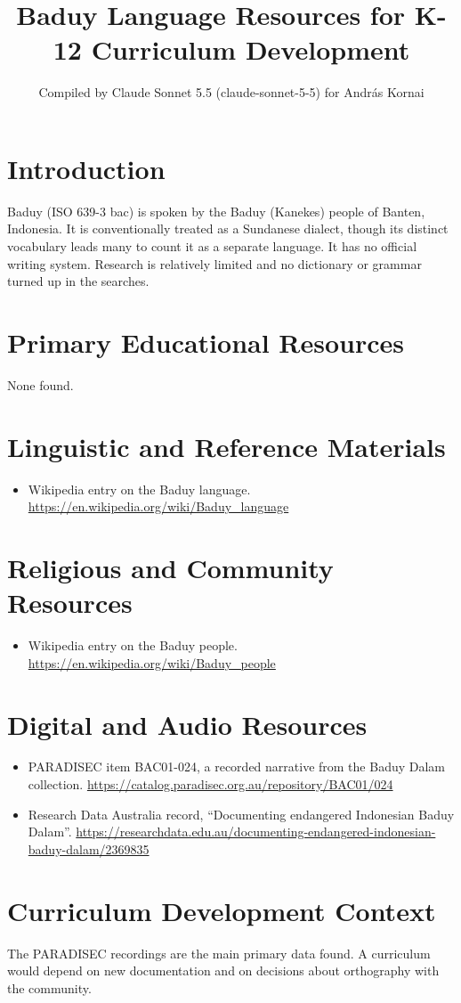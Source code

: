 \documentclass[12pt]{article}
\title{Baduy Language Resources for K-12 Curriculum Development}
\author{Compiled by Claude Sonnet 5.5 (claude-sonnet-5-5) for Andr\'as Kornai}
\date{}
\begin{document}
\maketitle

\section{Introduction}
Baduy (ISO 639-3 bac) is spoken by the Baduy (Kanekes) people of Banten, Indonesia. It is conventionally treated as a Sundanese dialect, though its distinct vocabulary leads many to count it as a separate language. It has no official writing system. Research is relatively limited and no dictionary or grammar turned up in the searches.

\section{Primary Educational Resources}
None found.

\section{Linguistic and Reference Materials}
\begin{itemize}
\item Wikipedia entry on the Baduy language. \url{https://en.wikipedia.org/wiki/Baduy_language}
\end{itemize}

\section{Religious and Community Resources}
\begin{itemize}
\item Wikipedia entry on the Baduy people. \url{https://en.wikipedia.org/wiki/Baduy_people}
\end{itemize}

\section{Digital and Audio Resources}
\begin{itemize}
\item PARADISEC item BAC01-024, a recorded narrative from the Baduy Dalam collection. \url{https://catalog.paradisec.org.au/repository/BAC01/024}
\item Research Data Australia record, ``Documenting endangered Indonesian Baduy Dalam''. \url{https://researchdata.edu.au/documenting-endangered-indonesian-baduy-dalam/2369835}
\end{itemize}

\section{Curriculum Development Context}
The PARADISEC recordings are the main primary data found. A curriculum would depend on new documentation and on decisions about orthography with the community.
\end{document}
